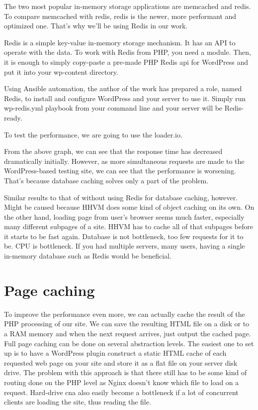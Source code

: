 The two most popular in-memory storage applications are memcached and redis. To compare memcached with redis, redis is the newer, more performant and optimized one. That's why we'll be using Redis in our work.

Redis is a simple key-value in-memory storage mechanism. It has an API to operate with the data. To work with Redis from PHP, you need a module. Then, it is enough to simply copy-paste a pre-made PHP Redis api for WordPress and put it into your wp-content directory.

Using Ansible automation, the author of the work has prepared a role, named Redis, to install and configure WordPress and your server to use it. Simply run wp-redis.yml playbook from your command line and your server will be Redis-ready.

To test the performance, we are going to use the loader.io.

From the above graph, we can see that the response time has decreased dramatically initially. However, as more simultaneous requests are made to the WordPress-based testing site, we can see that the performance is worsening. That's because database caching solves only a part of the problem.

Similar results to that of without using Redis for database caching, however. Might be caused because HHVM does some kind of object caching on its own. On the other hand, loading page from user's browser seems much faster, especially many different subpages of a site. HHVM has to cache all of that subpages before it starts to be fast again. Database is not bottleneck, too few requests for it to be. CPU is bottleneck. If you had multiple servers, many users, having a single in-memory database such as Redis would be beneficial.

\section{Page caching}

To improve the performance even more, we can actually cache the result of the PHP processing of our site. We can save the resulting HTML file on a disk or to a RAM memory and when the next request arrives, just output the cached page. Full page caching can be done on several abstraction levels. The easiest one to set up is to have a WordPress plugin construct a static HTML cache of each requested web page on your site and store it as a flat file on your server disk drive. The problem with this approach is that there still has to be some kind of routing done on the PHP level as Nginx doesn't know which file to load on a request. Hard-drive cna also easily become a bottleneck if a lot of concurrent clients are loading the site, thus reading the file.

